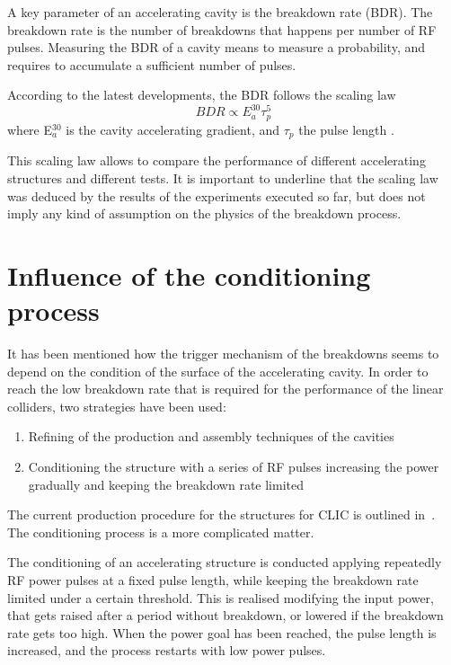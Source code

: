  A key parameter of an accelerating cavity is the breakdown rate (BDR). The breakdown rate is the number of breakdowns that happens per number of RF pulses. Measuring the BDR of a cavity means to measure a probability, and requires to accumulate a sufficient number of pulses. 

According to the latest developments, the BDR follows the scaling law
\begin{equation}
BDR \propto E^{30}_a \tau^5_p 
\label{E30}
\end{equation}
where E$^{30}_a$ is the cavity accelerating gradient, and $\tau_p$ the pulse length  \cite{Wuensch:advaces}.

This scaling law allows to compare the performance of different accelerating structures and different tests. It is important to underline that the scaling law was deduced by the results of the experiments executed so far, but does not imply any kind of assumption on the physics of the breakdown process.




\section[Influence of the conditioning process]{Influence of the conditioning process}
\label{sec:conditioning}

It has been mentioned how the trigger mechanism of the breakdowns seems to depend on the condition of the surface of the accelerating cavity. In order to reach the low breakdown rate that is required for the performance of the linear colliders, two strategies have been used:
\begin{enumerate}
\item Refining of the production and assembly techniques of the cavities
\item Conditioning the structure with a series of RF pulses increasing the power gradually and keeping the breakdown rate limited
\end{enumerate}
The current production procedure for the structures for CLIC is outlined in~\cite{CLIC:cdr}. The conditioning process is a more complicated matter. 

The conditioning of an accelerating structure is conducted applying repeatedly RF power pulses at a fixed pulse length, while keeping the breakdown rate limited under a certain threshold. This is realised modifying the input power, that gets raised after a period without breakdown, or lowered if the breakdown rate gets too high. When the power goal has been reached, the pulse length is increased, and the process restarts with low power pulses.

